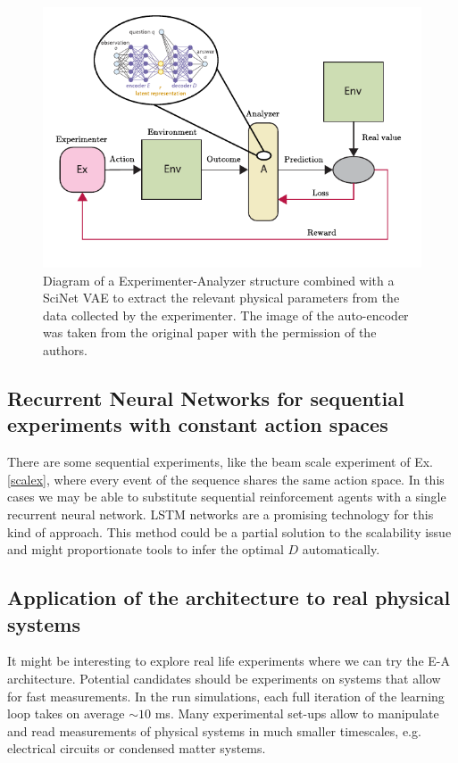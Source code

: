 \documentclass[11pt,a4paper,twoside]{report}
\newcommand{\+}{\textnormal{+} }
\theoremstyle{definition}
\numberwithin{equation}{chapter}
\begin{document}
\begin{figure}[t]
  \centering
  \includegraphics{figures/ScinetInEA.pdf}
  \caption{Diagram of a Experimenter-Analyzer structure combined with a SciNet
  VAE to extract the relevant physical parameters from the data collected by the
  experimenter. The image of the auto-encoder was taken from the original paper
  \cite{iten2020discovering} with the permission of the authors.}
  \label{}
\end{figure}

\subsection{Recurrent Neural Networks for sequential experiments with constant 
action spaces}

There are some sequential experiments, like the beam scale experiment of Ex.
\ref{scalex}, where every event of the sequence shares the same action space.
In this cases we may be able to substitute sequential reinforcement agents with
a single recurrent neural network. LSTM networks are a promising technology for
this kind of approach. This method could be a partial solution to the
scalability issue and might proportionate tools to infer the optimal $D$
automatically.

\subsection{Application of the architecture to real physical systems}

It might be interesting to explore real life experiments where we can try the
E-A architecture. Potential candidates should be experiments on systems that
allow for fast measurements. In the run simulations, each full iteration of
the learning loop takes on average $\sim 10$ ms. Many experimental set-ups allow
to manipulate and read measurements of physical systems in much smaller
timescales, e.g. electrical circuits or condensed matter systems.
\end{document}
